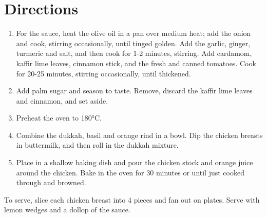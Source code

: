 \section*{Directions}
\begin{enumerate}
\item For the sauce, heat the olive oil in a pan over medium heat; add the onion and cook, stirring occasionally, until tinged golden. Add the garlic, ginger, turmeric and salt, and then cook for 1-2 minutes, stirring. Add cardamom, kaffir lime leaves, cinnamon stick, and the fresh and canned tomatoes. Cook for 20-25 minutes, stirring occasionally, until thickened.
\item Add palm sugar and season to taste. Remove, discard the kaffir lime leaves and cinnamon, and set aside.
\item Preheat the oven to 180°C.
\item Combine the dukkah, basil and orange rind in a bowl. Dip the chicken breasts in buttermilk, and then roll in the dukkah mixture.
\item Place in a shallow baking dish and pour the chicken stock and orange juice around the chicken. Bake in the oven for 30 minutes or until just cooked through and browned.
\end{enumerate}
To serve, slice each chicken breast into 4 pieces and fan out on plates. Serve with lemon wedges and a dollop of the sauce. 



